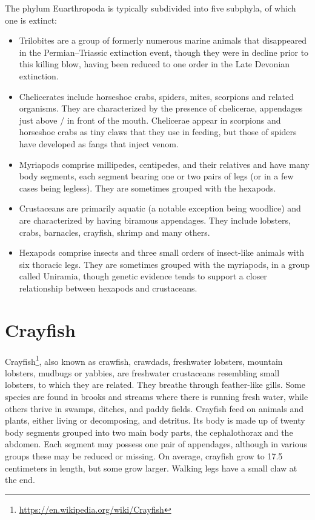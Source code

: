 \documentclass[]{book}
\providecommand{\tightlist}{%
  \setlength{\itemsep}{0pt}\setlength{\parskip}{0pt}}
\let\rmarkdownfootnote\footnote%
\def\footnote{\protect\rmarkdownfootnote}
\renewcommand{\href}[2]{#2\footnote{\url{#1}}}
\begin{document}
The phylum Euarthropoda is typically subdivided into five subphyla, of which one is extinct:

\begin{itemize}
\tightlist
\item
  Trilobites are a group of formerly numerous marine animals that disappeared in the Permian--Triassic extinction event, though they were in decline prior to this killing blow, having been reduced to one order in the Late Devonian extinction.
\item
  Chelicerates include horseshoe crabs, spiders, mites, scorpions and related organisms. They are characterized by the presence of chelicerae, appendages just above / in front of the mouth. Chelicerae appear in scorpions and horseshoe crabs as tiny claws that they use in feeding, but those of spiders have developed as fangs that inject venom.
\item
  Myriapods comprise millipedes, centipedes, and their relatives and have many body segments, each segment bearing one or two pairs of legs (or in a few cases being legless). They are sometimes grouped with the hexapods.
\item
  Crustaceans are primarily aquatic (a notable exception being woodlice) and are characterized by having biramous appendages. They include lobsters, crabs, barnacles, crayfish, shrimp and many others.
\item
  Hexapods comprise insects and three small orders of insect-like animals with six thoracic legs. They are sometimes grouped with the myriapods, in a group called Uniramia, though genetic evidence tends to support a closer relationship between hexapods and crustaceans.
\end{itemize}

\hypertarget{crayfish}{%
\section{Crayfish}\label{crayfish}}

\href{https://en.wikipedia.org/wiki/Crayfish}{Crayfish}, also known as crawfish, crawdads, freshwater lobsters, mountain lobsters, mudbugs or yabbies, are freshwater crustaceans resembling small lobsters, to which they are related. They breathe through feather-like gills. Some species are found in brooks and streams where there is running fresh water, while others thrive in swamps, ditches, and paddy fields. Crayfish feed on animals and plants, either living or decomposing, and detritus. Its body is made up of twenty body segments grouped into two main body parts, the cephalothorax and the abdomen. Each segment may possess one pair of appendages, although in various groups these may be reduced or missing. On average, crayfish grow to 17.5 centimeters in length, but some grow larger. Walking legs have a small claw at the end.
\end{document}

